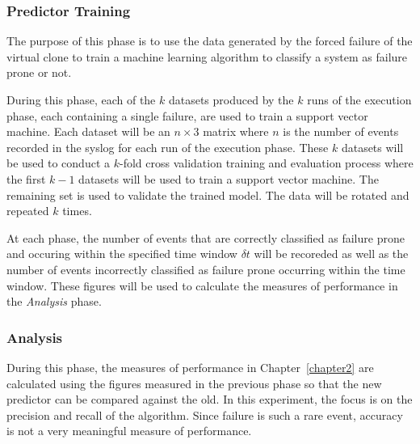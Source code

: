\subsubsection{Predictor Training}
The purpose of this phase is to use the data generated by the forced failure of
the virtual clone to train a machine learning algorithm to classify a system as
failure prone or not.  

During this phase, each of the $k$ datasets produced by the $k$ runs of the
execution phase, each containing a single failure, are used to train a support
vector machine.  Each dataset will be an $n \times 3$ matrix where $n$ is the
number of events recorded in the syslog for each run of the execution phase.
These $k$ datasets will be used to conduct a $k$-fold cross validation training
and evaluation process where the first $k - 1$ datasets will be used to train a
support vector machine.  The remaining set is used to validate the trained
model.  The data will be rotated and repeated $k$ times.

At each phase, the number of events that are correctly classified as failure
prone and occuring within the specified time window $\delta t$ will be
recoreded as well as the number of events incorrectly classified as failure
prone occurring within the time window.  These figures will be used to
calculate the measures of performance in the \emph{Analysis} phase.

\subsubsection{Analysis}
During this phase, the measures of performance in Chapter~\ref{chapter2} are
calculated using the figures measured in the previous phase so that the new
predictor can be compared against the old.  In this experiment, the focus is on
the precision and recall of the algorithm.  Since failure is such a rare event,
accuracy is not a very meaningful measure of performance.
